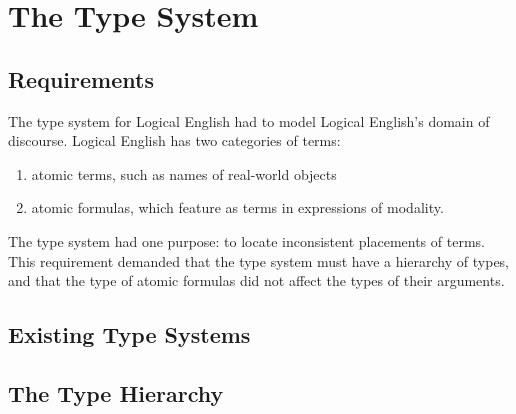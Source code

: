 \documentclass[../main.tex]{subfiles}
\begin{document}
\chapter{The Type System}
\section{Requirements}
The type system for Logical English had to model Logical English's domain of discourse. Logical English has two categories of terms:
\begin{enumerate}
    \item atomic terms, such as names of real-world objects
    \item atomic formulas, which feature as terms in expressions of modality.
\end{enumerate}
The type system had one purpose: to locate inconsistent placements of terms. This requirement demanded that the type system must have a hierarchy of types, and that the type of atomic formulas did not affect the types of their arguments.

\section{Existing Type Systems}

\section{The Type Hierarchy}
\end{document}
